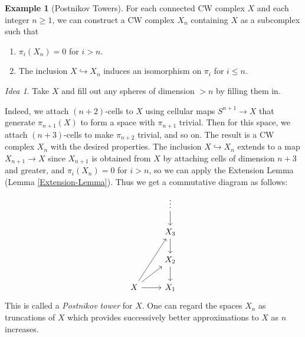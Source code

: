 \documentclass[reqno]{amsart}
\theoremstyle{definition}
\newtheorem{example}[theorem]{Example}
\theoremstyle{remark}
\newtheorem*{idea}{Idea}
\begin{document}
\begin{example}[Postnikov Towers]\label{Postnikov-Towers}
    For each connected CW complex $X$ and each
    integer $n\ge 1$, we can construct a 
    CW complex $X_n$ containing $X$ as a subcomplex such that
    \begin{enumerate}
        \item $\pi_i \left( X_n \right) = 0$ for $i>n$.
        \item The inclusion $X \hookrightarrow X_n$ induces
            an isomorphism on $\pi_i$ for $i\le n$.
    \end{enumerate}
    
    \begin{idea}
        Take $X$ and fill out any spheres of dimension
        $>n$ by filling them in.
    \end{idea}
    Indeed, we attach $(n+2)$-cells to
    $X$ using cellular maps $S^{n+1} \to X$ that
    generate $\pi_{n+1}(X)$ to form a 
    space with $\pi_{n+1}$ trivial. Then
    for this space, we attach $(n+3)$-cells to
    make $\pi_{n+2}$ trivial, and so on. The result
    is a CW complex $X_n$ with the desired properties.
    The inclusion $X \hookrightarrow X_n$ extends
    to a map $X_{n+1} \to X$ since
    $X_{n+1}$ is obtained from $X$ by attaching cells
    of dimension $n+3$ and greater, and
    $\pi_i (X_n) = 0$ for $i>n$, so we
    can apply the Extension Lemma (Lemma \ref{Extension-Lemma}).
    Thus we get a commutative diagram as follows:
    \begin{equation*}
    \begin{tikzcd}
        & \vdots \ar[d] \\
        & X_3 \ar[d] \\
        & X_2 \ar[d] \\
        X \ar[r] \ar[ru] \ar[ruu] & X_1
    \end{tikzcd}
    \end{equation*}
    This is called a \textit{Postnikov tower} for $X$.
    One can regard the spaces $X_n$ as truncations of
    $X$ which provides successively better approximations
    to $X$ as $n$ increases.
    


\end{example}
\end{document}
